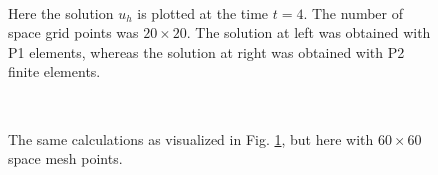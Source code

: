 \documentclass[twoside]{article}
\begin{document}
\begin{figure} 
  \centering
  \mbox{
    \quad
  }
  \centering
  \caption{Here the solution $u_{h}$ is plotted at the time $t = 4$. The number of space grid points was $20 \times 20$. The solution at left was obtained with P1 elements, whereas the solution at right was obtained with P2 finite elements.} \label{fig:t4_Nx20}
\end{figure}


\begin{figure}
  \centering
  \mbox{
    \quad
  }
  \centering
  \caption{The same calculations as visualized in Fig. \ref{fig:t4_Nx20}, but here with $60 \times 60$ space mesh points.} \label{fig:t4_Nx60}

\end{figure}
\end{document}
